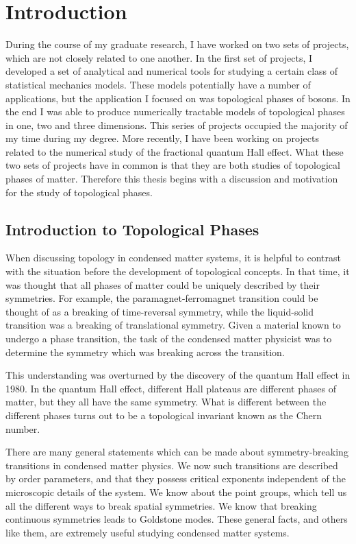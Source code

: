 \chapter{Introduction}

During the course of my graduate research, I have worked on two sets of projects, which are not closely related to one another. In the first set of projects, I developed a set of analytical and numerical tools for studying a certain class of statistical mechanics models. These models potentially have a number of applications, but the application I focused on was topological phases of bosons. In the end I was able to produce numerically tractable models of topological phases in one, two and three dimensions. This series of projects occupied the majority of my time during my degree. 
More recently, I have been working on projects related to the numerical study of the fractional quantum Hall effect. What these two sets of projects have in common is that they are both studies of topological phases of matter. Therefore this thesis begins with a discussion and motivation for the study of topological phases.

\section{Introduction to Topological Phases}

When discussing topology in condensed matter systems, it is helpful to contrast with the situation before the development of topological concepts. In that time, it was thought that all phases of matter could be uniquely described by their symmetries. For example, the paramagnet-ferromagnet transition could be thought of as a breaking of time-reversal symmetry, while the liquid-solid transition was a breaking of translational symmetry. Given a material known to undergo a phase transition, the task of the condensed matter physicist was to determine the symmetry which was breaking across the transition.

This understanding was overturned by the discovery of the quantum Hall effect in 1980.\cite{vonKlitzing} In the quantum Hall effect, different Hall plateaus are different phases of matter, but they all have the same symmetry. What is different between the different phases turns out to be a topological invariant known as the Chern number. 

There are many general statements which can be made about symmetry-breaking transitions in condensed matter physics. We now such transitions are described by order parameters, and that they possess critical exponents independent of the microscopic details of the system. We know about the point groups, which tell us all the different ways to break spatial symmetries. We know that breaking continuous symmetries leads to Goldstone modes. These general facts, and others like them, are extremely useful studying condensed matter systems. 

